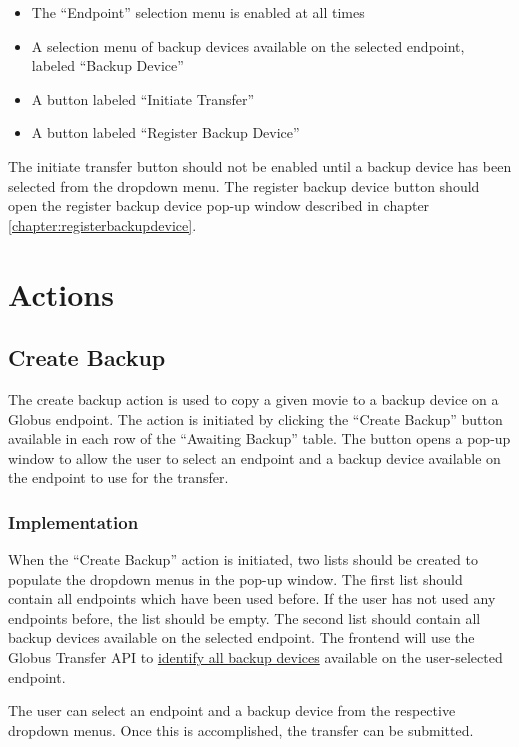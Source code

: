 \begin{itemize}\itemsep1pt
  \item The ``Endpoint'' selection menu is enabled at all times
  \item A selection menu of backup devices available on the selected endpoint, labeled
  ``Backup Device''
  \item A button labeled ``Initiate Transfer''
  \item A button labeled ``Register Backup Device''
\end{itemize}


The initiate transfer button should not be enabled until a backup device 
has been selected from the dropdown menu. The register backup device button should 
open the register backup device pop-up window described in chapter 
\ref{chapter:registerbackupdevice}.

\section{Actions}

\subsection{Create Backup}

The create backup action is used to copy a given movie to a backup device on a Globus
endpoint. The action is initiated by clicking the ``Create Backup'' button available 
in each row of the ``Awaiting Backup'' table. The button opens a pop-up window to
allow the user to select an endpoint and a backup device available on the endpoint 
to use for the transfer.

\subsubsection{Implementation}

When the ``Create Backup'' action is initiated, two lists should be created to populate
the dropdown menus in the pop-up window. The first list should contain all endpoints
which have been used before. If the user has not used any endpoints before, the list
should be empty. The second list should contain all backup devices available on the
selected endpoint. The frontend will use the Globus Transfer API to 
\href{appendix:identifybackupdevices}{identify all backup devices} available on the 
user-selected endpoint.

The user can select an endpoint and a backup device from the respective dropdown menus.
Once this is accomplished, the transfer can be submitted.
